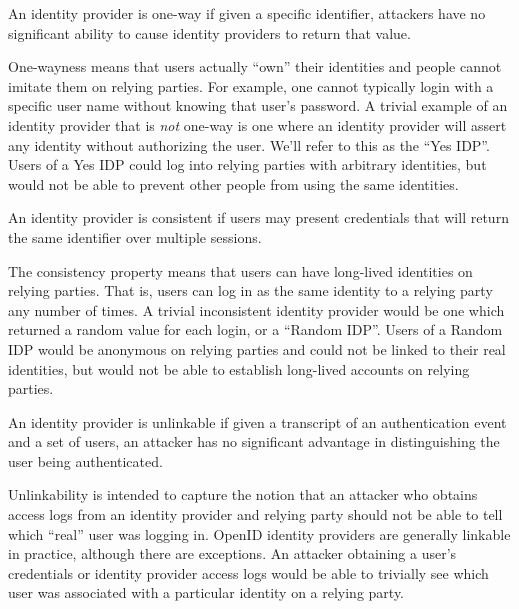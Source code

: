 \documentclass{llncs}
\begin{document}
\begin{definition}
\label{def:ownership}
An identity provider is one-way if given a specific identifier,
attackers have no significant ability to cause identity providers to
return that value.
\end{definition}

One-wayness means that users actually ``own'' their identities and
people cannot imitate them on relying parties. For example, one cannot
typically login with a specific user name without knowing that user's
password. A trivial example of an identity provider that is
\textit{not} one-way is one where an identity provider will assert any
identity without authorizing the user.  We'll refer to this as the
``Yes IDP''. Users of a Yes IDP could log into relying parties with
arbitrary identities, but would not be able to prevent other people
from using the same identities.

\begin{definition}[Consistency]
\label{def:consistency}
An identity provider is consistent if users may present credentials
that will return the same identifier over multiple sessions.
\end{definition}

The consistency property means that users can have long-lived
identities on relying parties. That is, users can log in as the same
identity to a relying party any number of times. A trivial
inconsistent identity provider would be one which returned a random
value for each login, or a ``Random IDP''. Users of a Random IDP would
be anonymous on relying parties and could not be linked to their real
identities, but would not be able to establish long-lived accounts on
relying parties.

\begin{definition}[Unlinkability]
\label{def:unlinkability}
An identity provider is unlinkable if given a transcript of an
authentication event and a set of users, an attacker has no
significant advantage in distinguishing the user being authenticated.
\end{definition}

Unlinkability is intended to capture the notion that an attacker who
obtains access logs from an identity provider and relying party should
not be able to tell which ``real'' user was logging in. OpenID
identity providers are generally linkable in practice, although there
are exceptions. An attacker obtaining a user's credentials or identity provider
access logs would be able to trivially see which user was associated
with a particular identity on a relying party.
\end{document}
